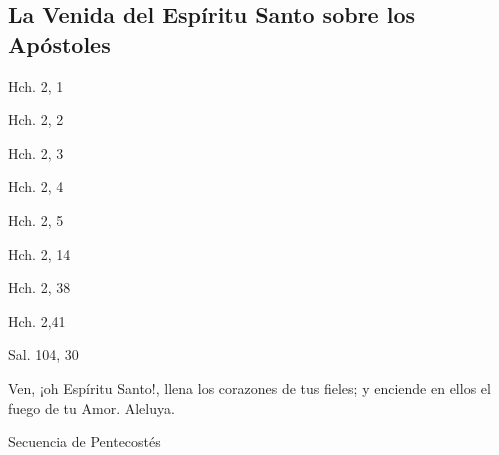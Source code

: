 \documentclass[a4paper,11pt]{article}
\begin{document}
    \subsection*{\hfil La Venida del Espíritu Santo sobre los Apóstoles \hfil}
      \begin{flushright}
        Hch. 2, 1
      \end{flushright}      
      \begin{flushright}
        Hch. 2, 2
      \end{flushright}      
      \begin{flushright}
        Hch. 2, 3
      \end{flushright}      
      \begin{flushright}
        Hch. 2, 4
      \end{flushright}      
      \begin{flushright}
        Hch. 2, 5
      \end{flushright}      
      \begin{flushright}
        Hch. 2, 14
      \end{flushright}      
      \begin{flushright}
        Hch. 2, 38
      \end{flushright}      
      \begin{flushright}
        Hch. 2,41
      \end{flushright}      
      \begin{flushright}
        Sal. 104, 30
      \end{flushright}      
      Ven, ¡oh Espíritu Santo!, llena los corazones de tus fieles; y enciende en ellos el fuego de tu Amor. Aleluya.
      \begin{flushright}
        Secuencia de Pentecostés
      \end{flushright}
\end{document}
